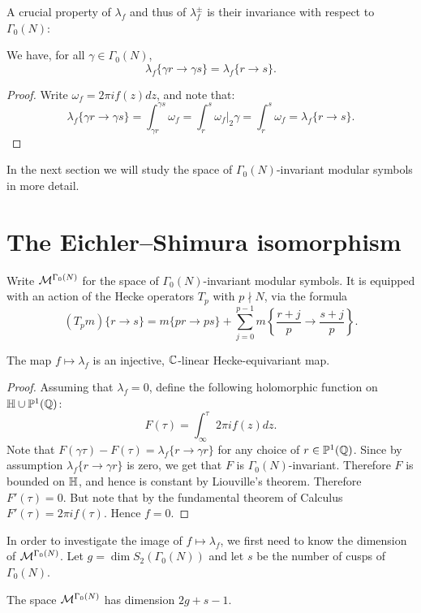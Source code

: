 A crucial property of $\lambda_f$ and thus of $\lambda_f^\pm$ is their invariance with respect to $\Gamma_0(N)$:
\begin{proposition}
  We have, for all $\gamma\in\Gamma_0(N)$,
\[
\lambda_f\{\gamma r\to \gamma s\} = \lambda_f\{r\to s\}.
\]
\end{proposition}
\begin{proof}
  Write $\omega_f = 2\pi i f(z)dz$, and note that:
\[
\lambda_f\{\gamma r\to \gamma s\}=\int_{\gamma r}^{\gamma s}\omega_f = \int_{r}^{s} \omega_f|_2\gamma = \int_r^s \omega_f=\lambda_f\{r\to s\}.
\]
\end{proof}
In the next section we will study the space of $\Gamma_0(N)$-invariant modular symbols in more detail.

\section{The Eichler--Shimura isomorphism}

Write $\mathcal{M}^{\Gamma_0(N)}$ for the space of $\Gamma_0(N)$-invariant modular symbols. It is equipped with an action of the Hecke operators $T_p$ with $p\nmid N$, via the formula
\[
(T_p m)\{r\to s\} = m\{pr\to ps\} + \sum_{j=0}^{p-1}m\left\{\frac{r+j}{p}\to\frac{s+j}{p}\right\}.
\]

\begin{proposition}
  The map $f\mapsto \lambda_f$ is an injective, $\mathbb{C}$-linear Hecke-equivariant map.
\end{proposition}
\begin{proof}
  Assuming that $\lambda_f=0$, define the following holomorphic function on $\mathbb{H}\cup \mathbb{P}^1(\mathbb{Q})$:
\[
F(\tau) = \int_\infty^\tau 2\pi i f(z)dz.
\]
Note that $F(\gamma\tau)-F(\tau) = \lambda_f\{r\to\gamma r\}$ for any choice of $r\in\mathbb{P}^1(\mathbb{Q})$. Since by assumption $\lambda_f\{r\to\gamma r\}$ is zero, we get that $F$ is $\Gamma_0(N)$-invariant. Therefore $F$ is bounded on $\mathbb{H}$, and hence is constant by Liouville's theorem. Therefore $F'(\tau)=0$. But note that by the fundamental theorem of Calculus $F'(\tau)=2\pi i f(\tau)$. Hence $f=0$.
\end{proof}

In order to investigate the image of $f\mapsto \lambda_f$, we first need to know the dimension of $\mathcal{M}^{\Gamma_0(N)}$. Let $g=\dim S_2(\Gamma_0(N))$ and let $s$ be the number of cusps of $\Gamma_0(N)$.
\begin{theorem}
The space $\mathcal{M}^{\Gamma_0(N)}$ has dimension $2g+s-1$.
\end{theorem}

